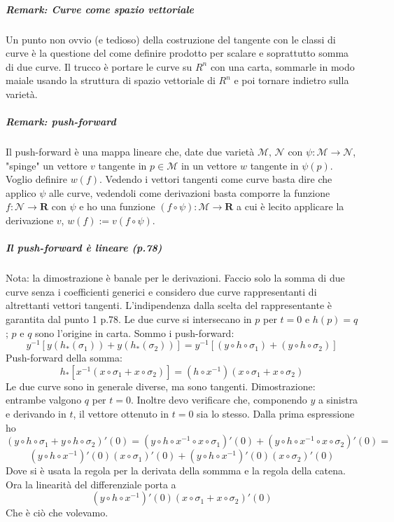 \documentclass[]{article}
\begin{document}
\subparagraph{Remark: Curve come spazio vettoriale}
Un punto non ovvio (e tedioso) della costruzione del tangente con le classi di curve è la questione del come definire prodotto per scalare e soprattutto somma di due curve. Il trucco è portare le curve su $R^n$ con una carta, sommarle in modo maiale usando la struttura di spazio vettoriale di $R^n$ e poi tornare indietro sulla varietà.

\subparagraph{Remark: push-forward}
Il push-forward è una mappa lineare che, date due varietà $\mathcal{M},\,\mathcal{N}$ con $\psi: \mathcal{M} \rightarrow \mathcal{N}$, "spinge" un vettore $v$ tangente in $p\in \mathcal{M}$ in un vettore $w$ tangente in $\psi(p)$. Voglio definire $w(f)$. Vedendo i vettori tangenti come curve basta dire che applico $\psi$ alle curve, vedendoli come derivazioni basta comporre la funzione $f: \mathcal{N}\rightarrow \mathbf{R}$ con $\psi$ e ho una funzione $(f \circ \psi): \mathcal{M} \rightarrow \mathbf{R}$ a cui è lecito applicare la derivazione $v$, $w(f) := v(f\circ \psi)$.

\subparagraph{Il push-forward è lineare (p.78)}
Nota: la dimostrazione è banale per le derivazioni.
Faccio solo la somma di due curve senza i coefficienti generici e considero due curve rappresentanti di altrettanti vettori tangenti. L'indipendenza dalla scelta del rappresentante è garantita dal punto 1 p.78. Le due curve si intersecano in $p$ per $t=0$ e $h(p) = q$; $p$ e $q$ sono l'origine in carta. Sommo i push-forward:
$$y^{-1} [y(h_*(\sigma_1)) + y(h_*(\sigma_2))] = y^{-1} [(y \circ h \circ \sigma_1) + (y \circ h \circ \sigma_2)]$$
Push-forward della somma:
$$h_*[x^{-1}(x \circ \sigma_1 + x \circ \sigma_2)] = (h \circ x^{-1})(x \circ \sigma_1 + x \circ \sigma_2)$$
Le due curve sono in generale diverse, ma sono tangenti. Dimostrazione: entrambe valgono $q$ per $t=0$. Inoltre devo verificare che, componendo $y$ a sinistra e derivando in $t$, il vettore ottenuto in $t=0$ sia lo stesso. Dalla prima espressione ho
$$(y \circ h \circ \sigma_1 + y \circ h \circ \sigma_2)'(0) = (y \circ h \circ x^{-1} \circ x \circ \sigma_1)'(0) + (y \circ h \circ x^{-1} \circ x \circ \sigma_2)'(0) =$$
$$(y \circ h \circ x^{-1})'(0) (x \circ \sigma_1)'(0) + (y \circ h \circ x^{-1})'(0) (x \circ \sigma_2)'(0)$$
Dove si è usata la regola per la derivata della sommma e la regola della catena. Ora la linearità del differenziale porta a
$$(y \circ h \circ x^{-1})'(0) (x \circ \sigma_1 + x \circ \sigma_2)'(0)$$
Che è ciò che volevamo.
\end{document}
